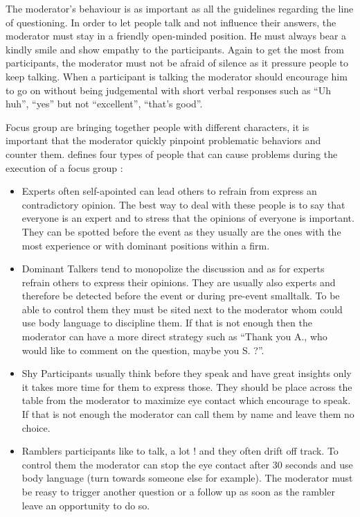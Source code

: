 \documentclass[10pt]{report}
\begin{document}
The moderator's behaviour is as important as all the guidelines regarding the line of questioning. In order to let people talk and not influence their answers, the moderator must stay in a friendly open-minded position. He must always bear a kindly smile and show empathy to the participants. Again to get the most from participants, the moderator must not be afraid of silence as it pressure people to keep talking. When a participant is talking the moderator should encourage him to go on without being judgemental with short verbal responses such as \enquote{Uh huh}, \enquote{yes} but not \enquote{excellent}, \enquote{that's good}.

Focus group are bringing together people with different characters, it is important that the moderator quickly pinpoint problematic behaviors and counter them. \autocite{Krueger2000} defines four types of people that can cause problems during the execution of a focus group :
\begin{itemize}
\item Experts often self-apointed can lead others to refrain from express an contradictory opinion. The best way to deal with these people is to say that everyone is an expert and to stress that the opinions of everyone is important. They can be spotted before the event as they usually are the ones with the most experience or with dominant positions within a firm.
\item Dominant Talkers tend to monopolize the discussion and as for experts refrain others to express their opinions. They are usually also experts and therefore be detected before the event or during pre-event smalltalk. To be able to control them they must be sited next to the moderator whom could use body language to discipline them. If that is not enough then the moderator can have a more direct strategy such as \enquote{Thank you A., who would like to comment on the question, maybe you S. ?}.
\item Shy Participants usually think before they speak and have great insights only it takes more time for them to express those. They should be place across the table from the moderator to maximize eye contact which encourage to speak. If that is not enough the moderator can call them by name and leave them no choice.
\item Ramblers participants like to talk, a lot ! and they often drift off track. To control them the moderator can stop the eye contact after 30 seconds and use body language (turn towards someone else for example). The moderator must be reasy to trigger another question or a follow up as soon as the rambler leave an opportunity to do so.
\end{itemize}
\end{document}
